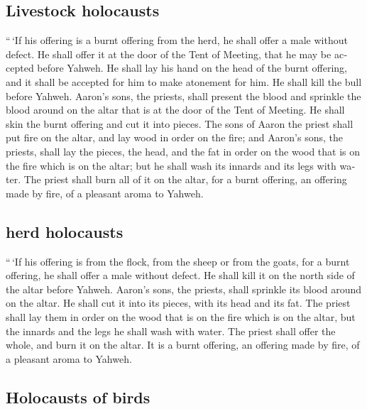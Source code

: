 \begin{paracol}{2}
\begin{otherlanguage}{english}
\hypertarget{livestock-holocausts}{%
\subsection{Livestock holocausts}\label{livestock-holocausts}}

 ``\,`If his offering is a burnt offering from the herd,
he shall offer a male without defect. He shall offer it at the door of
the Tent of Meeting, that he may be accepted before Yahweh.
 He shall lay his hand on the head of the burnt offering,
and it shall be accepted for him to make atonement for him.
 He shall kill the bull before Yahweh. Aaron's sons, the
priests, shall present the blood and sprinkle the blood around on the
altar that is at the door of the Tent of Meeting.  He
shall skin the burnt offering and cut it into pieces.  The
sons of Aaron the priest shall put fire on the altar, and lay wood in
order on the fire;  and Aaron's sons, the priests, shall
lay the pieces, the head, and the fat in order on the wood that is on
the fire which is on the altar;  but he shall wash its
innards and its legs with water. The priest shall burn all of it on the
altar, for a burnt offering, an offering made by fire, of a pleasant
aroma to Yahweh.

\hypertarget{herd-holocausts}{%
\subsection{herd holocausts}\label{herd-holocausts}}

 ``\,`If his offering is from the flock, from the sheep
or from the goats, for a burnt offering, he shall offer a male without
defect.  He shall kill it on the north side of the altar
before Yahweh. Aaron's sons, the priests, shall sprinkle its blood
around on the altar.  He shall cut it into its pieces,
with its head and its fat. The priest shall lay them in order on the
wood that is on the fire which is on the altar,  but the
innards and the legs he shall wash with water. The priest shall offer
the whole, and burn it on the altar. It is a burnt offering, an offering
made by fire, of a pleasant aroma to Yahweh.

\hypertarget{holocausts-of-birds}{%
\subsection{Holocausts of birds}\label{holocausts-of-birds}}


\end{otherlanguage}
\end{paracol}
